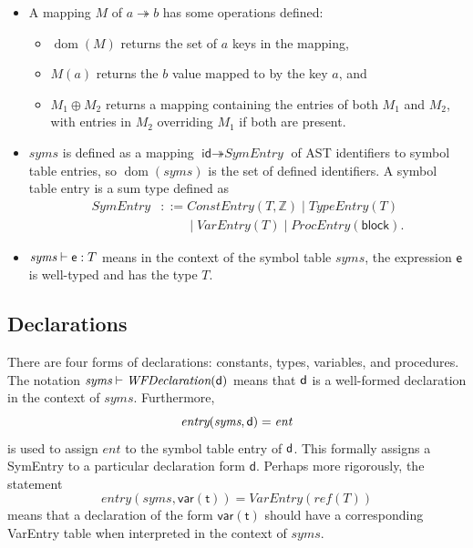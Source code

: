 \documentclass[10pt,a4paper,]{article}
\providecommand{\tightlist}{%
  \setlength{\itemsep}{0pt}\setlength{\parskip}{0pt}}
\begin{document}
\begin{itemize}
\item
  A mapping \(M\) of \(a \twoheadrightarrow b\) has some operations
  defined:

  \begin{itemize}
  \tightlist
  \item
    \(\operatorname*{dom}(M)\) returns the set of \(a\) keys in the
    mapping,
  \item
    \(M(a)\) returns the \(b\) value mapped to by the key \(a\), and
  \item
    \(M_1 \oplus M_2\) returns a mapping containing the entries of both
    \(M_1\) and \(M_2\), with entries in \(M_2\) overriding \(M_1\) if
    both are present.
  \end{itemize}
\item
  \(\textit{syms}\) is defined as a mapping
  \(\textsf{id} \twoheadrightarrow \textit{SymEntry}\) of AST
  identifiers to symbol table entries, so
  \(\operatorname*{dom}(\textit{syms})\) is the set of defined
  identifiers. A symbol table entry is a sum type defined as \[
  \begin{aligned}
  \textit{SymEntry} &::= \textit{ConstEntry}(T, \mathbb Z) \mid \textit{TypeEntry}(T) \\
  &\qquad\mid \textit{VarEntry}(T) \mid \textit{ProcEntry}(\textsf{block}).
  \end{aligned}
  \]
\item
  \(\textit{syms} \vdash \textsf e : T\) means in the context of the
  symbol table \(\textit{syms}\), the expression \(\textsf e\) is
  well-typed and has the type \(T\).
\end{itemize}

\hypertarget{declarations}{%
\subsection{Declarations}\label{declarations}}

There are four forms of declarations: constants, types, variables, and
procedures. The notation
\(\textit{syms} \vdash \textit{WFDeclaration}(\textsf d)\) means that
\(\textsf d\) is a well-formed declaration in the context of
\(\textit{syms}\). Furthermore, \[
\textit{entry}(\textit{syms}, \textsf d)=\textit{ent}
\] is used to assign \(\textit{ent}\) to the symbol table entry of
\(\textsf d\). This formally assigns a SymEntry to a particular
declaration form \(\textsf{d}\). Perhaps more rigorously, the statement
\[
\textit{entry}(\textit{syms}, \textsf{var}(\textsf{t})) = \textit{VarEntry}(\textit{ref}(T))
\] means that a declaration of the form \(\textsf{var}(\textsf{t})\)
should have a corresponding VarEntry table when interpreted in the
context of \(\textit{syms}\).
\end{document}
